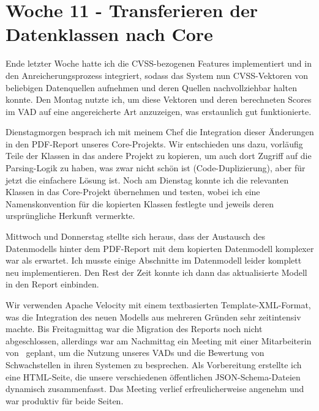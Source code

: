 \section{Woche 11 - Transferieren der Datenklassen nach Core} \label{sec:bericht-wo-11}


\lweekdaymarginpar{\weekdayMondayLong}

Ende letzter Woche hatte ich die CVSS-bezogenen Features implementiert und in den Anreicherungsprozess integriert, sodass das System nun CVSS-Vektoren von beliebigen Datenquellen aufnehmen und deren Quellen nachvollziehbar halten konnte.
Den Montag nutzte ich, um diese Vektoren und deren berechneten Scores im VAD auf eine angereicherte Art anzuzeigen, was erstaunlich gut funktionierte.

\sweekdaymarginpar{\weekdayTuesdayLong}

Dienstagmorgen besprach ich mit meinem Chef die Integration dieser Änderungen in den PDF-Report unseres Core-Projekts.
Wir entschieden uns dazu, vorläufig Teile der Klassen in das andere Projekt zu kopieren, um auch dort Zugriff auf die Parsing-Logik zu haben, was zwar nicht schön ist (Code-Duplizierung), aber für jetzt die einfachere Lösung ist.
Noch am Dienstag konnte ich die relevanten Klassen in das Core-Projekt übernehmen und testen, wobei ich eine Namenskonvention für die kopierten Klassen festlegte und jeweils deren ursprüngliche Herkunft vermerkte.

\sweekdaymarginpar{\weekdayWednesdayShort\ - \weekdayFridayShort}

Mittwoch und Donnerstag stellte sich heraus, dass der Austausch des Datenmodells hinter dem PDF-Report mit dem kopierten Datenmodell komplexer war als erwartet.
Ich musste einige Abschnitte im Datenmodell leider komplett neu implementieren.
Den Rest der Zeit konnte ich dann das aktualisierte Modell in den Report einbinden.

Wir verwenden Apache Velocity mit einem textbasierten Template-XML-Format, was die Integration des neuen Modells aus mehreren Gründen sehr zeitintensiv machte.
Bis Freitagmittag war die Migration des Reports noch nicht abgeschlossen, allerdings war am Nachmittag ein Meeting mit einer Mitarbeiterin von \aeclientZEZESE\ geplant, um die Nutzung unseres VADs und die Bewertung von Schwachstellen in ihren Systemen zu besprechen.
Als Vorbereitung erstellte ich eine HTML-Seite, die unsere verschiedenen öffentlichen JSON-Schema-Dateien dynamisch zusammenfasst.
Das Meeting verlief erfreulicherweise angenehm und war produktiv für beide Seiten.
